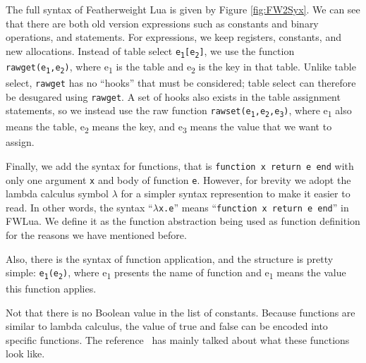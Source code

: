 The full syntax of Featherweight Lua is given by Figure \ref{fig:FW2Syx}. We can see that there are both old version expressions such as constants and binary operations, and statements. For expressions, we keep registers, constants, and new allocations.
Instead of table select {\tt e\textsubscript{1}[e\textsubscript{2}]}, we use the function {\tt rawget(e\textsubscript{1},e\textsubscript{2})}, where e\textsubscript{1} is the table and e\textsubscript{2} is the key in that table.
Unlike table select, {\tt rawget} has no ``hooks'' that must be considered; table select can therefore be desugared using {\tt rawget}.
A set of hooks also exists in the table assignment statements, so we instead use the raw function {\tt rawset(e\textsubscript{1},e\textsubscript{2},e\textsubscript{3})}, where e\textsubscript{1} also means the table, e\textsubscript{2} means the key, and e\textsubscript{3} means the value that we want to assign.

Finally, we add the syntax for functions, that is {\tt function x return e end} with only one argument {\tt x} and body of function {\tt e}. However, for brevity we adopt the lambda calculus symbol $\lambda$ for a simpler syntax represention to make it easier to read. In other words, the syntax ``{\tt $\lambda$x.e}'' means ``{\tt function x return e end}'' in FWLua. We define it as the function abstraction being used as function definition for the reasons we have mentioned before. 

Also, there is the syntax of function application, and the structure is pretty simple: {\tt e\textsubscript{1}(e\textsubscript{2})}, where e\textsubscript{1} presents the name of function and e\textsubscript{1} means the value this function applies.

Not that there is no Boolean value in the list of constants. Because functions are similar to lambda calculus, the value of true and false can be encoded into specific functions. The reference~\cite{LC} has mainly talked about what these functions look like.

